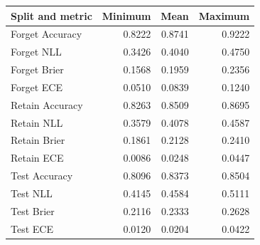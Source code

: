\begin{tabular}{lrrr}
\toprule
Split and metric & Minimum & Mean & Maximum \\
\midrule
Forget Accuracy & 0.8222 & 0.8741 & 0.9222 \\
Forget NLL & 0.3426 & 0.4040 & 0.4750 \\
Forget Brier & 0.1568 & 0.1959 & 0.2356 \\
Forget ECE & 0.0510 & 0.0839 & 0.1240 \\
Retain Accuracy & 0.8263 & 0.8509 & 0.8695 \\
Retain NLL & 0.3579 & 0.4078 & 0.4587 \\
Retain Brier & 0.1861 & 0.2128 & 0.2410 \\
Retain ECE & 0.0086 & 0.0248 & 0.0447 \\
Test Accuracy & 0.8096 & 0.8373 & 0.8504 \\
Test NLL & 0.4145 & 0.4584 & 0.5111 \\
Test Brier & 0.2116 & 0.2333 & 0.2628 \\
Test ECE & 0.0120 & 0.0204 & 0.0422 \\
\bottomrule
\end{tabular}
